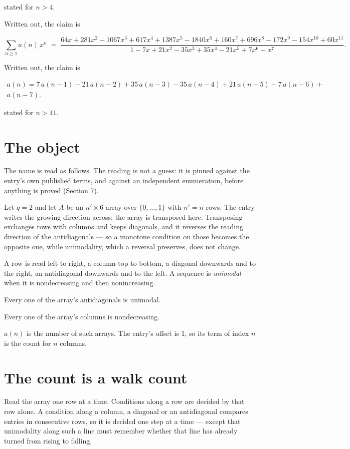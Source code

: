 \documentclass[11pt]{article}
\theoremstyle{definition}
\begin{document}
stated for $n > 4$.

Written out, the claim is

\[\sum_{n \ge 1} a(n)\,x^n \;=\; \frac{64x + 281x^{2} - 1067x^{3} + 617x^{4} + 1387x^{5} - 1840x^{6} + 160x^{7} + 696x^{8} - 172x^{9} - 154x^{10} + 60x^{11}}{1 - 7x + 21x^{2} - 35x^{3} + 35x^{4} - 21x^{5} + 7x^{6} - x^{7}}.\]

Written out, the claim is

\begin{multline*} a(n) = 7\,a(n-1) - 21\,a(n-2) + 35\,a(n-3) - 35\,a(n-4) + 21\,a(n-5) - 7\,a(n-6) + \\ a(n-7). \end{multline*}

stated for $n > 11$.

\section{The object}

The name is read as follows. The reading is not a guess: it is pinned against the entry's own published terms, and against an independent enumeration, before anything is proved (Section 7).

Let $q = 2$ and let $A$ be an $n' \times 6$ array over $\{0,\dots,1\}$ with $n' = n$ rows. The entry writes the growing direction across; the array is transposed here. Transposing exchanges rows with columns and keeps diagonals, and it reverses the reading direction of the antidiagonals --- so a monotone condition on those becomes the opposite one, while unimodality, which a reversal preserves, does not change.

A row is read left to right, a column top to bottom, a diagonal downwards and to the right, an antidiagonal downwards and to the left. A sequence is {\itshape unimodal} when it is nondecreasing and then nonincreasing.

Every one of the array's antidiagonals is unimodal.

Every one of the array's columns is nondecreasing.

$a(n)$ is the number of such arrays. The entry's offset is 1, so its term of index $n$ is the count for $n$ columns.

\section{The count is a walk count}

Read the array one row at a time. Conditions along a row are decided by that row alone. A condition along a column, a diagonal or an antidiagonal compares entries in consecutive rows, so it is decided one step at a time --- except that unimodality along such a line must remember whether that line has already turned from rising to falling.
\end{document}
